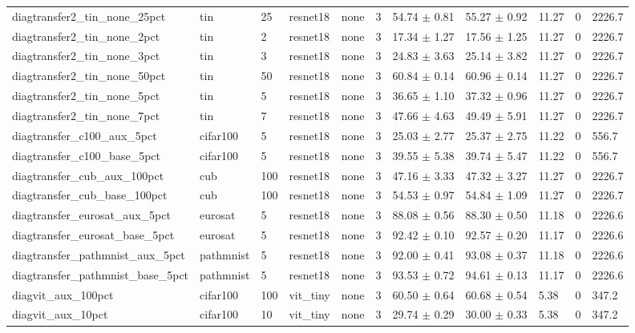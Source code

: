 \begin{tabular}{lllllllllll}
diagtransfer2_tin_none_25pct & tin & 25 & resnet18 & none & 3 & 54.74 $\pm$ 0.81 & 55.27 $\pm$ 0.92 & 11.27 & 0 & 2226.7 \\
diagtransfer2_tin_none_2pct & tin & 2 & resnet18 & none & 3 & 17.34 $\pm$ 1.27 & 17.56 $\pm$ 1.25 & 11.27 & 0 & 2226.7 \\
diagtransfer2_tin_none_3pct & tin & 3 & resnet18 & none & 3 & 24.83 $\pm$ 3.63 & 25.14 $\pm$ 3.82 & 11.27 & 0 & 2226.7 \\
diagtransfer2_tin_none_50pct & tin & 50 & resnet18 & none & 3 & 60.84 $\pm$ 0.14 & 60.96 $\pm$ 0.14 & 11.27 & 0 & 2226.7 \\
diagtransfer2_tin_none_5pct & tin & 5 & resnet18 & none & 3 & 36.65 $\pm$ 1.10 & 37.32 $\pm$ 0.96 & 11.27 & 0 & 2226.7 \\
diagtransfer2_tin_none_7pct & tin & 7 & resnet18 & none & 3 & 47.66 $\pm$ 4.63 & 49.49 $\pm$ 5.91 & 11.27 & 0 & 2226.7 \\
diagtransfer_c100_aux_5pct & cifar100 & 5 & resnet18 & none & 3 & 25.03 $\pm$ 2.77 & 25.37 $\pm$ 2.75 & 11.22 & 0 & 556.7 \\
diagtransfer_c100_base_5pct & cifar100 & 5 & resnet18 & none & 3 & 39.55 $\pm$ 5.38 & 39.74 $\pm$ 5.47 & 11.22 & 0 & 556.7 \\
diagtransfer_cub_aux_100pct & cub & 100 & resnet18 & none & 3 & 47.16 $\pm$ 3.33 & 47.32 $\pm$ 3.27 & 11.27 & 0 & 2226.7 \\
diagtransfer_cub_base_100pct & cub & 100 & resnet18 & none & 3 & 54.53 $\pm$ 0.97 & 54.84 $\pm$ 1.09 & 11.27 & 0 & 2226.7 \\
diagtransfer_eurosat_aux_5pct & eurosat & 5 & resnet18 & none & 3 & 88.08 $\pm$ 0.56 & 88.30 $\pm$ 0.50 & 11.18 & 0 & 2226.6 \\
diagtransfer_eurosat_base_5pct & eurosat & 5 & resnet18 & none & 3 & 92.42 $\pm$ 0.10 & 92.57 $\pm$ 0.20 & 11.17 & 0 & 2226.6 \\
diagtransfer_pathmnist_aux_5pct & pathmnist & 5 & resnet18 & none & 3 & 92.00 $\pm$ 0.41 & 93.08 $\pm$ 0.37 & 11.18 & 0 & 2226.6 \\
diagtransfer_pathmnist_base_5pct & pathmnist & 5 & resnet18 & none & 3 & 93.53 $\pm$ 0.72 & 94.61 $\pm$ 0.13 & 11.17 & 0 & 2226.6 \\
diagvit_aux_100pct & cifar100 & 100 & vit_tiny & none & 3 & 60.50 $\pm$ 0.64 & 60.68 $\pm$ 0.54 & 5.38 & 0 & 347.2 \\
diagvit_aux_10pct & cifar100 & 10 & vit_tiny & none & 3 & 29.74 $\pm$ 0.29 & 30.00 $\pm$ 0.33 & 5.38 & 0 & 347.2 \\

\end{tabular}
